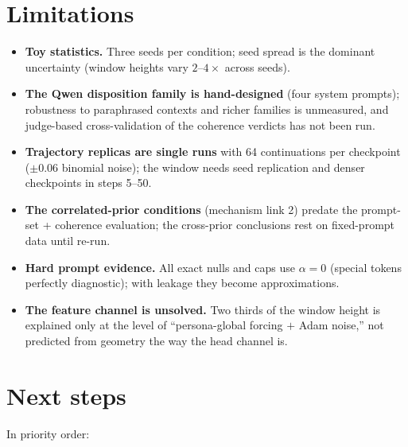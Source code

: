 \documentclass[11pt]{article}
\begin{document}
\section{Limitations}
\label{sec:limitations}

\begin{itemize}
  \item \textbf{Toy statistics.} Three seeds per condition; seed spread is the dominant
  uncertainty (window heights vary $2$--$4\times$ across seeds).
  \item \textbf{The Qwen disposition family is hand-designed} (four system prompts);
  robustness to paraphrased contexts and richer families is unmeasured, and judge-based
  cross-validation of the coherence verdicts has not been run.
  \item \textbf{Trajectory replicas are single runs} with 64 continuations per checkpoint
  ($\pm0.06$ binomial noise); the window needs seed replication and denser checkpoints in
  steps 5--50.
  \item \textbf{The correlated-prior conditions} (mechanism link 2) predate the prompt-set +
  coherence evaluation; the cross-prior conclusions rest on fixed-prompt data until re-run.
  \item \textbf{Hard prompt evidence.} All exact nulls and caps use $\alpha=0$ (special
  tokens perfectly diagnostic); with leakage they become approximations.
  \item \textbf{The feature channel is unsolved.} Two thirds of the window height is
  explained only at the level of ``persona-global forcing $+$ Adam noise,'' not predicted
  from geometry the way the head channel is.
\end{itemize}

\section{Next steps}
\label{sec:next}

In priority order:
\end{document}
